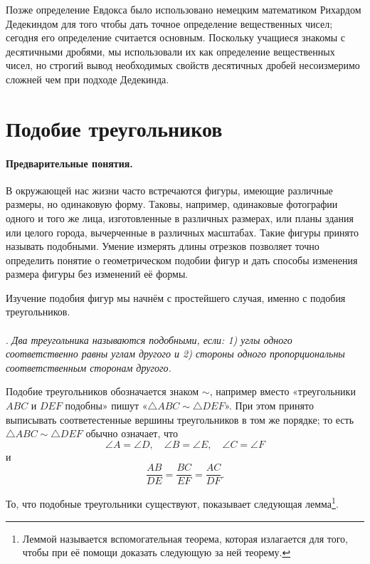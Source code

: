 \documentclass[oneside]{book}
\makeatletter
\newcommand{\rindex}[2][\imki@jobname]{%
  \index[#1]{\detokenize{#2}}%
}
\makeatother
\begin{document}
Позже определение Евдокса было использовано немецким математиком Рихардом Дедекиндом для того чтобы дать точное определение вещественных чисел;
сегодня его определение считается основным.
Поскольку учащиеся знакомы с десятичными дробями, мы использовали их как определение вещественных чисел, но строгий вывод необходимых свойств десятичных дробей несоизмеримо сложней чем при подходе Дедекинда.




\section{Подобие треугольников}

\paragraph{Предварительные понятия.}\label{1938/156}
В окружающей нас жизни часто встречаются фигуры, имеющие различные размеры, но одинаковую форму.
Таковы, например, одинаковые фотографии одного и того же лица, изготовленные в различных размерах, или планы здания или целого города, вычерченные в различных масштабах. 
Такие фигуры принято называть подобными.
Умение измерять длины отрезков позволяет точно определить понятие о геометрическом подобии фигур и дать способы изменения размера фигуры без изменений её формы.

Изучение подобия фигур мы начнём с простейшего случая, именно с подобия треугольников.

\paragraph{}\label{1938/158}
.
\emph{Два треугольника называются \rindex{подобные треугольники}подобными, если:
1) углы одного соответственно равны углам другого и 
2) стороны одного пропорциональны соответственным сторонам другого.}


Подобие треугольников обозначается знаком $\sim$, например вместо «треугольники $ABC$ и $DEF$ подобны» пишут «$\triangle ABC\sim \triangle DEF$».
При этом принято выписывать соответестенные вершины треугольников в том же порядке;
то есть  $\triangle ABC\sim \triangle DEF$ обычно означает, что 
\[\angle A=\angle D,\quad
 \angle B=\angle E,\quad
 \angle C=\angle F
\]
и
\[\frac{AB}{DE}=\frac{BC}{EF}=\frac{AC}{DF}.\]

То, что подобные треугольники существуют, показывает следующая лемма\footnote{Леммой называется вспомогательная теорема, которая излагается для того, чтобы при её помощи доказать следующую за ней теорему.}.
\end{document}
